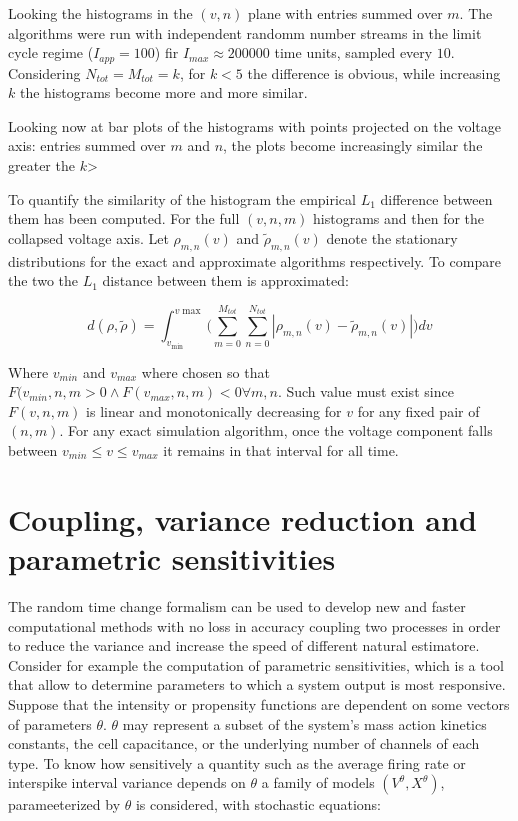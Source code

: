 Looking the histograms in the $(v, n)$ plane with entries summed over $m$.
The algorithms were run with independent randomm number streams in the limit cycle regime ($I_{app} = 100$) fir $I_{max} \approx 200000$ time units, sampled every $10$.
Considering $N_{tot} = M_{tot} = k$, for $k<5$ the difference is obvious, while increasing $k$ the histograms become more and more similar.

Looking now at bar plots of the histograms with points projected on the voltage axis: entries summed over $m$ and $n$, the plots become increasingly similar the greater the $k$>

To quantify the similarity of the histogram the empirical $L_1$ difference between them has been computed.
For the full $(v, n, m)$ histograms and then for the collapsed voltage axis.
Let $\rho_{m,n}(v)$ and $\tilde{\rho}_{m, n}(v)$ denote the stationary distributions for the exact and approximate algorithms respectively.
To compare the two the $L_1$ distance between them is approximated:

$$d(\rho,\tilde{\rho}) = \int_{v_{\min}}^{v{\max}}\biggl(\sum\limits_{m=0}^{M_{tot}}\sum\limits_{n=0}^{N_{tot}}|\rho_{m, n}(v)-\tilde{\rho}_{m,n}(v)|\biggr)dv$$

Where $v_{min}$ and $v_{max}$ where chosen so that $F(v_{min}, n, m>0\land F(v_{max}, n, m)<0\forall m,n$.
Such value must exist since $F(v,n,m)$ is linear and monotonically decreasing for $v$ for any fixed pair of $(n,m)$.
For any exact simulation algorithm, once the voltage component falls between $v_{min}\le v \le v_{max}$ it remains in that interval for all time.

\section{Coupling, variance reduction and parametric sensitivities}
The random time change formalism can be used to develop new and faster computational methods with no loss in accuracy coupling two processes in order to reduce the variance and increase the speed of different natural estimatore.
Consider for example the computation of parametric sensitivities, which is a tool that allow to determine parameters to which a system output is most responsive.
Suppose that the intensity or propensity functions are dependent on some vectors of parameters $\theta$.
$\theta$ may represent a subset of the system's mass action kinetics constants, the cell capacitance, or the underlying number of channels of each type.
To know how sensitively a quantity such as the average firing rate or interspike interval variance depends on $\theta$ a family of models $(V^\theta, X^\theta)$, parameeterized by $\theta$ is considered, with stochastic equations:

